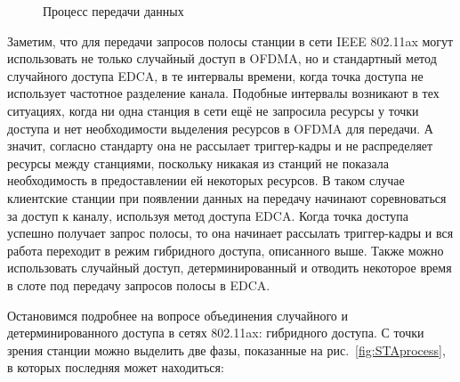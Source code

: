 \begin{figure*}[t]
\begin{scaletikzpicturetowidth}{0.85\textwidth}
	\end{scaletikzpicturetowidth}
	\caption{\label{fig:periodicJESUS} Процесс передачи данных}
\end{figure*}

Заметим, что для передачи запросов полосы станции в сети IEEE 802.11ax могут использовать не только случайный доступ в OFDMA, но и стандартный метод случайного доступа EDCA, в те интервалы времени, когда точка доступа не использует частотное разделение канала. 
Подобные интервалы возникают в тех ситуациях, когда ни одна станция в сети ещё не запросила ресурсы у точки доступа и нет необходимости выделения ресурсов в OFDMA для передачи. А значит, согласно стандарту она не рассылает триггер-кадры и не распределяет ресурсы между станциями, поскольку никакая из станций не показала необходимость в предоставлении ей некоторых ресурсов. В таком случае клиентские станции при появлении данных на передачу начинают соревноваться за доступ к каналу, используя метод доступа EDCA. Когда точка доступа успешно получает запрос полосы, то она начинает рассылать триггер-кадры и вся работа переходит в режим гибридного доступа, описанного выше. Также можно использовать случайный доступ, детерминированный и отводить некоторое время в слоте под передачу запросов полосы в EDCA. 

Остановимся подробнее на вопросе объединения случайного и детерминированного доступа в сетях 802.11ax: гибридного доступа. С точки зрения станции можно выделить две фазы, показанные на рис.~\ref{fig:STAprocess}, в которых последняя может находиться: 

